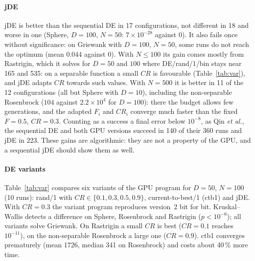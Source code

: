 \documentclass[conference]{IEEEtran}
\begin{document}
\paragraph{jDE} jDE is better than the sequential DE in 17 configurations, not different in 18
and worse in one (Sphere, $D=100$, $N=50$: $7\times10^{-28}$ against 0). It also fails once
without significance: on Griewank with $D=100$, $N=50$, some runs do not reach the optimum
(mean 0.044 against 0). With $N\le100$ its gain comes mostly from Rastrigin, which it solves
for $D=50$ and $100$ where DE/rand/1/bin stays near 165 and 535: on a separable function a
small $CR$ is favourable (Table~\ref{tab:var}), and jDE adapts $CR$ towards such values. With
$N=500$ it is better in 11 of the 12 configurations (all but Sphere with $D=10$), including the
non-separable Rosenbrock
($104$ against $2.2\times10^4$ for $D=100$): there the budget allows few generations, and the
adapted $F_i$ and $CR_i$ converge much faster than the fixed $F=0.5$, $CR=0.3$. Counting as a
success a final error below $10^{-8}$, as Qin \emph{et al.}, the sequential DE and both GPU
versions succeed in 140 of their 360 runs and jDE in 223. These gains are algorithmic: they
are not a property of the GPU, and a sequential jDE should show them as well.

\paragraph{DE variants} Table~\ref{tab:var} compares six variants of the GPU program for
$D=50$, $N=100$ (10 runs): rand/1 with $CR\in\{0.1,0.3,0.5,0.9\}$, current-to-best/1 (ctb1)
and jDE. With $CR=0.3$ the variant program reproduces version~2 bit for bit. Kruskal--Wallis
detects a difference on Sphere, Rosenbrock and Rastrigin ($p<10^{-6}$); all variants solve
Griewank. On Rastrigin a small $CR$ is best ($CR=0.1$ reaches $10^{-11}$), on the
non-separable Rosenbrock a large one ($CR=0.9$). ctb1 converges prematurely (mean 1726,
median 341 on Rosenbrock) and costs about 40\,\% more time.
\end{document}

